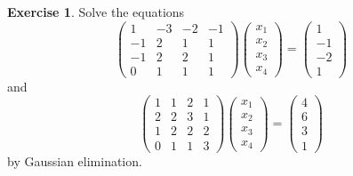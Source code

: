 \documentclass[12pt]{article}
\theoremstyle{definition}
\newtheorem{exercise}{Exercise}
\begin{document}
\begin{exercise}\label{r2-ex-two-systems}
Solve the equations
\[
\begin{pmatrix}1&-3&-2&-1\\-1&2&1&1\\-1&2&2&1\\0&1&1&1\end{pmatrix}\begin{pmatrix}x_1\\x_2\\x_3\\x_4\end{pmatrix}
=\begin{pmatrix}1\\-1\\-2\\1\end{pmatrix}
\]
and
\[
\begin{pmatrix}1&1&2&1\\2&2&3&1\\1&2&2&2\\0&1&1&3\end{pmatrix}\begin{pmatrix}x_1\\x_2\\x_3\\x_4\end{pmatrix}=\begin{pmatrix}4\\6\\3\\1\end{pmatrix}
\]
by Gaussian elimination.
\end{exercise}
\end{document}
